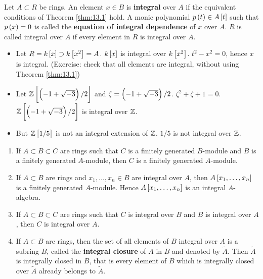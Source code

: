 \begin{definition}
Let $ A \subset R $ be rings. An element $ x \in B $ is \textbf{integral} over $ A $ if the equivalent conditions of Theorem \ref{thm:13.1} hold. A monic polynomial $ p\br{t} \in A\sbr{t} $ such that $ p\br{x} = 0 $ is called the \textbf{equation of integral dependence} of $ x $ over $ A $. $ R $ is called integral over $ A $ if every element in $ R $ is integral over $ A $.
\end{definition}

\begin{example*}
\hfill
\begin{itemize}
\item Let $ R = k\sbr{x} \supset k\sbr{x^2} = A $. $ k\sbr{x} $ is integral over $ k\sbr{x^2} $. $ t^2 - x^2 = 0 $, hence $ x $ is integral. (Exercise: check that all elements are integral, without using Theorem \ref{thm:13.1})
\item Let $ \Z\sbr{\br{-1 + \sqrt{-3}} / 2} $ and $ \zeta = \br{-1 + \sqrt{-3}} / 2 $. $ \zeta^2 + \zeta + 1 = 0 $. $ \Z\sbr{\br{-1 + \sqrt{-3}} / 2} $ is integral over $ \mathbb{Z} $.
\item But $ \Z\sbr{1 / 5} $ is not an integral extension of $ \mathbb{Z} $. $ 1 / 5 $ is not integral over $ \mathbb{Z} $.
\end{itemize}
\end{example*}

\pagebreak

\begin{lemma}
\hfill
\begin{enumerate}
\item If $ A \subset B \subset C $ are rings such that $ C $ is a finitely generated $ B $-module and $ B $ is a finitely generated $ A $-module, then $ C $ is a finitely generated $ A $-module.
\item If $ A \subset B $ are rings and $ x_1, \dots, x_n \in B $ are integral over $ A $, then $ A\sbr{x_1, \dots, x_n} $ is a finitely generated $ A $-module. Hence $ A\sbr{x_1, \dots, x_n} $ is an integral $ A $-algebra.
\item If $ A \subset B \subset C $ are rings such that $ C $ is integral over $ B $ and $ B $ is integral over $ A $, then $ C $ is integral over $ A $.
\item If $ A \subset B $ are rings, then the set of all elements of $ B $ integral over $ A $ is a subring $ B $, called the \textbf{integral closure} of $ A $ in $ B $ and denoted by $ \widetilde{A} $. Then $ \widetilde{A} $ is integrally closed in $ B $, that is every element of $ B $ which is integrally closed over $ \widetilde{A} $ already belongs to $ \widetilde{A} $.
\end{enumerate}
\end{lemma}

